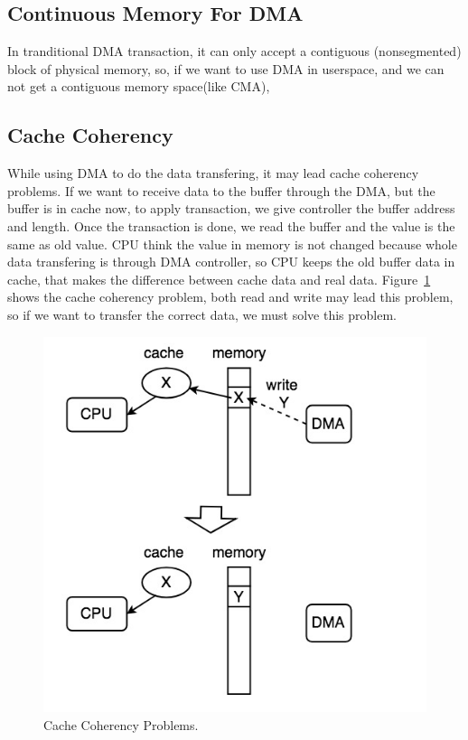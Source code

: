 \subsection{Continuous Memory For DMA}
\label{subsec:Continuous Memory For DMA}
In tranditional DMA transaction, it can only accept a contiguous (nonsegmented) block of
physical memory, so, if we want to use DMA in userspace, and we can not get a contiguous 
memory space(like CMA), 




\subsection{Cache Coherency}
\label{subsec:Cache Coherency}
While using DMA to do the data transfering, it may lead cache coherency problems. If we want to receive data to the buffer through the DMA, but the buffer is in cache now, to apply transaction, we give controller the buffer address and length. Once the transaction is done, we read the buffer and the value is the same as old value. CPU think the value in memory is not changed because whole data transfering is through DMA controller, so CPU keeps the old buffer data in cache, that makes the difference between cache data and real data. Figure~\ref{fig:Cache Coherency Problems.} shows the cache coherency problem, both read and write may lead this problem, so if we want to transfer the correct data, we must solve this problem.
\begin{figure}[!htb]
  \centering
  \includegraphics[scale=0.5]{images/cache_coherency.jpg}
  \caption[Cache Coherency Problems.]{Cache Coherency Problems.}
  \label{fig:Cache Coherency Problems.}
\end{figure}
\newpage

